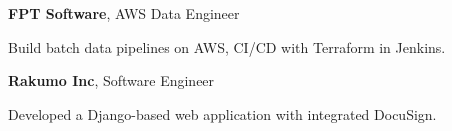 
\begin{twocolentry}{
	}
	\textbf{FPT Software}, AWS Data Engineer

	\begin{highlights}
		\item Build batch data pipelines on AWS, CI/CD with Terraform in Jenkins.
	\end{highlights}
\end{twocolentry}


\begin{twocolentry}{
	}
	\textbf{Rakumo Inc}, Software Engineer
	\begin{highlights}
		\item Developed a Django-based web application with integrated DocuSign.
	\end{highlights}
\end{twocolentry}
